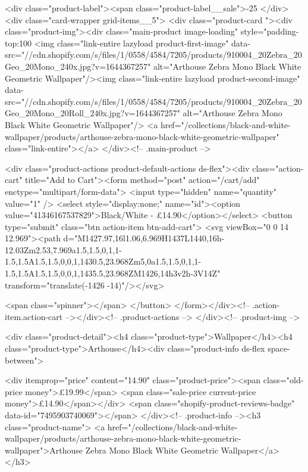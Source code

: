 {{{{{{{<div class="product-label"><span class="product-label__sale">-25%
          </div><div class="card-wrapper grid-items__5">
            <div class="product-card "><div class="product-img"><div class="main-product image-loading" style="padding-top:100%
      <img class="link-entire lazyload product-first-image" data-src="//cdn.shopify.com/s/files/1/0558/4584/7205/products/910004_20Zebra_20Geo_20Mono_240x.jpg?v=1644367257" alt="Arthouse Zebra Mono Black White Geometric Wallpaper"/><img class="link-entire lazyload product-second-image" data-src="//cdn.shopify.com/s/files/1/0558/4584/7205/products/910004_20Zebra_20Geo_20Mono_20Roll_240x.jpg?v=1644367257" alt="Arthouse Zebra Mono Black White Geometric Wallpaper"/>
      <a href="/collections/black-and-white-wallpaper/products/arthouse-zebra-mono-black-white-geometric-wallpaper" class="link-entire"></a>
    </div><!-- .main-product -->
  
<div class="product-actions product-default-actions ds-flex"><div class="action-cart" title="Add to Cart"><form method="post" action="/cart/add" enctype="multipart/form-data">
            <input type="hidden" name="quantity" value="1" />
            <select style="display:none;" name="id"><option value="41346167537829">Black/White - £14.90</option></select>
            <button type="submit" class="btn action-item btn-add-cart">
              <svg viewBox="0 0 14 12.969"><path d="M1427.97,16l1.06,6.969H1437L1440,16h-12.03Zm2.53,7.969a1.5,1.5,0,1,1-1.5,1.5A1.5,1.5,0,0,1,1430.5,23.968Zm5,0a1.5,1.5,0,1,1-1.5,1.5A1.5,1.5,0,0,1,1435.5,23.968ZM1426,14h3v2h-3V14Z" transform="translate(-1426 -14)"/></svg>

              <span class="spinner"></span>
            </button>
          </form></div><!-- .action-item.action-cart --></div><!-- .product-actions -->
</div><!-- .product-img -->

<div class="product-detail"><h4 class="product-type">Wallpaper</h4><h4 class="product-type">Arthouse</h4><div class="product-info ds-flex space-between">
    
<div itemprop="price" content="14.90" class="product-price"><span class="old-price money">£19.99</span>
    <span class="sale-price current-price money">£14.90</span></div>
    <span class="shopify-product-reviews-badge" data-id="7495903740069"></span>
  </div><!-- .product-info --><h3 class="product-name">
      <a href="/collections/black-and-white-wallpaper/products/arthouse-zebra-mono-black-white-geometric-wallpaper">Arthouse Zebra Mono Black White Geometric Wallpaper</a>
    </h3>
    
}}}}}}}
